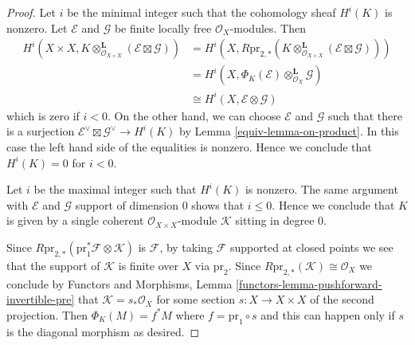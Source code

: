 \begin{proof}

Let $i$ be the minimal integer such that the cohomology sheaf $H^i(K)$ is
nonzero. Let $\mathcal{E}$ and $\mathcal{G}$ be finite locally free
$\mathcal{O}_X$-modules. Then
\begin{align*}
H^i(X \times X, K \otimes_{\mathcal{O}_{X \times X}}^\mathbf{L}
(\mathcal{E} \boxtimes \mathcal{G}))
& =
H^i(X, R\text{pr}_{2, *}(K \otimes_{\mathcal{O}_{X \times X}}^\mathbf{L}
(\mathcal{E} \boxtimes \mathcal{G}))) \\
& =
H^i(X, \Phi_K(\mathcal{E}) \otimes_{\mathcal{O}_X}^\mathbf{L} \mathcal{G}) \\
& \cong
H^i(X, \mathcal{E} \otimes \mathcal{G})
\end{align*}
which is zero if $i < 0$. On the other hand, we can choose
$\mathcal{E}$ and $\mathcal{G}$ such that there is a surjection
$\mathcal{E}^\vee \boxtimes \mathcal{G}^\vee \to H^i(K)$
by Lemma \ref{equiv-lemma-on-product}.
In this case the left hand side of the equalities is nonzero.
Hence we conclude that $H^i(K) = 0$ for $i < 0$.

\medskip\noindent
Let $i$ be the maximal integer such that $H^i(K)$ is nonzero.
The same argument with $\mathcal{E}$ and $\mathcal{G}$
support of dimension $0$ shows that $i \leq 0$.
Hence we conclude that $K$ is given by a single coherent
$\mathcal{O}_{X \times X}$-module $\mathcal{K}$ sitting in degree $0$.

\medskip\noindent
Since $R\text{pr}_{2, *}(\text{pr}_1^*\mathcal{F} \otimes \mathcal{K})$
is $\mathcal{F}$, by taking $\mathcal{F}$ supported at closed points
we see that the support of $\mathcal{K}$ is finite over $X$ via
$\text{pr}_2$. Since $R\text{pr}_{2, *}(\mathcal{K}) \cong \mathcal{O}_X$
we conclude by Functors and Morphisms, Lemma
\ref{functors-lemma-pushforward-invertible-pre}
that $\mathcal{K} = s_*\mathcal{O}_X$ for some section $s : X \to X \times X$
of the second projection. Then $\Phi_K(M) = f^*M$ where
$f = \text{pr}_1 \circ s$ and this can happen only if $s$
is the diagonal morphism as desired.
\end{proof}

